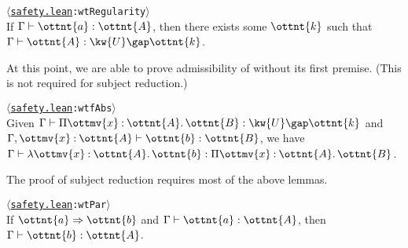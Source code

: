 \documentclass[a4paper,UKenglish,cleveref,autoref,thm-restate]{lipics-v2021}
\newcommand{\repo}{https://github.com/ionathanch/TTBFL}
\newcommand{\thmref}[2]{%
  $\langle$\href{\repo/tree/main/src/#1}{\texttt{#1}}\texttt{:#2}$\rangle$%
}
\begin{document}

\begin{lemma}[Regularity] \thmref{safety.lean}{wtRegularity} \label{lem:wt:reg} \\
  If $ \Gamma  \vdash  \ottnt{a}  \mathrel{:}  \ottnt{A} $, then there exists some $\ottnt{k}$ such that
  $ \Gamma  \vdash  \ottnt{A}  \mathrel{:}   \kw{U} \gap  \ottnt{k}  $.
\end{lemma}


At this point, we are able to prove admissibility of 
without its first premise. (This is not required for subject reduction.)

\begin{corollary} \thmref{safety.lean}{wtfAbs} \label{Lam'} \\
  Given $ \Gamma  \vdash   \Pi  \ottmv{x}  \mathbin{:}  \ottnt{A}  \mathpunct{.}  \ottnt{B}   \mathrel{:}   \kw{U} \gap  \ottnt{k}  $ and $  \Gamma ,  \ottmv{x}  \mathbin{:}  \ottnt{A}   \vdash  \ottnt{b}  \mathrel{:}  \ottnt{B} $,
  we have $ \Gamma  \vdash   \lambda  \ottmv{x}  \mathbin{:}  \ottnt{A}  \mathpunct{.}  \ottnt{b}   \mathrel{:}   \Pi  \ottmv{x}  \mathbin{:}  \ottnt{A}  \mathpunct{.}  \ottnt{B}  $.
\end{corollary}

The proof of subject reduction requires most of the above lemmas.

\begin{theorem} \thmref{safety.lean}{wtPar} \label{lem:preservation} \\
  If $ \ottnt{a}  \Rightarrow  \ottnt{b} $ and $ \Gamma  \vdash  \ottnt{a}  \mathrel{:}  \ottnt{A} $, then $ \Gamma  \vdash  \ottnt{b}  \mathrel{:}  \ottnt{A} $.
\end{theorem}
\end{document}
